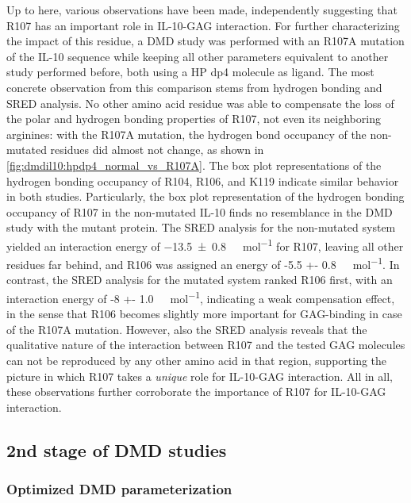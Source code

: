 Up to here, various observations have been made, independently suggesting that
R107 has an important role in IL-10-GAG interaction. For further characterizing
the impact of this residue, a DMD study was performed with an R107A mutation of
the IL-10 sequence while keeping all other parameters equivalent to another
study performed before, both using a HP dp4 molecule as ligand. The most
concrete observation from this comparison stems from hydrogen bonding and SRED
analysis. No other amino acid residue was able to compensate the loss of the
polar and hydrogen bonding properties of R107, not even its neighboring
arginines: with the R107A mutation, the hydrogen bond occupancy of the
non-mutated residues did almost not change, as shown in
\cref{fig:dmdil10:hpdp4_normal_vs_R107A}. The box plot representations of the
hydrogen bonding occupancy of R104, R106, and K119 indicate similar behavior in
both studies. Particularly, the box plot representation of the hydrogen bonding
occupancy of R107 in the non-mutated IL-10 finds no resemblance in the DMD study
with the mutant protein. The SRED analysis for the non-mutated system yielded an
interaction energy of
\SI{-13.5 +- 0.8}{\kilo\calory\per\mol} for R107, leaving all other residues far
behind, and R106 was assigned an energy of \SI{-5.5 +-
0.8}{\kilo\calory\per\mol}. In contrast, the SRED analysis for the mutated
system ranked R106 first, with an interaction energy of \SI{-8 +-
1.0}{\kilo\calory\per\mol}, indicating a weak compensation effect, in the sense
that R106 becomes slightly more important for GAG-binding in case of the R107A
mutation. However, also the SRED analysis reveals that the qualitative nature of
the interaction between R107 and the tested GAG molecules can not be reproduced
by any other amino acid in that region, supporting the picture in which R107
takes a \textit{unique} role for IL-10-GAG interaction. All in all, these
observations further corroborate the importance of R107 for IL-10-GAG
interaction.


\subsection{2nd stage of DMD studies}


\subsubsection{Optimized DMD parameterization}
\label{dmdil10:method_setup_2nd}

